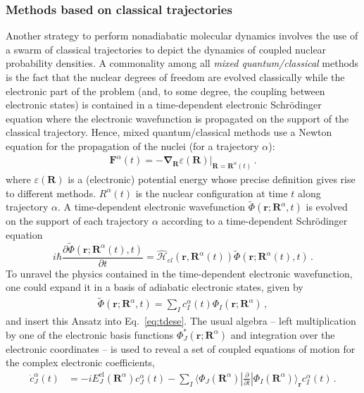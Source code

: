 \documentclass[9pt,bestpractices,pubversion]{livecoms}
\newcommand{\bra}[1]{\langle #1|}
\newcommand{\ket}[1]{|#1\rangle}
\newcommand{\bs}{\mathbf}
\begin{document}
\subsubsection{Methods based on classical trajectories}
\label{sec:classtrajmethod}

Another strategy to perform nonadiabatic molecular dynamics involves the use of a swarm of classical trajectories to depict the dynamics of coupled nuclear probability densities. A commonality among all \textit{mixed quantum/classical} methods is the fact that the nuclear degrees of freedom are evolved classically while the electronic part of the problem (and, to some degree, the coupling between electronic states) is contained in a time-dependent electronic Schr\"{o}dinger equation where the electronic wavefunction is propagated on the support of the classical trajectory. Hence, mixed quantum/classical methods use a Newton equation for the propagation of the nuclei (for a trajectory $\alpha$):
\begin{align}
\mathbf F^{\alpha}(t) = -\boldsymbol\nabla_{\bs R} \varepsilon(\bs R)|_{\bs R = \bs R^{\alpha}(t)} \, .
\label{eqn: quantum-classical general}
\end{align}
where $\varepsilon(\bs R)$ is a (electronic) potential energy whose precise definition gives rise to different methods. $R^{\alpha}(t)$ is the nuclear configuration at time $t$ along trajectory $\alpha$. A time-dependent electronic wavefunction $\tilde{\Phi}(\bs r; \bs R^{\alpha}, t)$ is evolved on the support of each trajectory $\alpha$ according to a time-dependent Schr\"{o}dinger equation
\begin{equation}
i \hbar \frac{\partial \tilde{\Phi}(\bs r; \bs R^\alpha(t), t)}{\partial t} = \hat{\mathcal{H}}_{el}(\bs r, \bs R^\alpha(t)) \tilde{\Phi}(\bs r; \bs R^\alpha(t), t) \, .
\label{eq:tdese}
\end{equation}
To unravel the physics contained in the time-dependent electronic wavefunction, one could expand it in a basis of adiabatic electronic states,
given by 
\begin{align}
\tilde{\Phi}(\bs r; \bs R^{\alpha}, t) = \sum_I c_I^\alpha(t) \Phi_I(\bs r; \bs R^{\alpha}) \, ,
\label{eqn: surface-hopping BH expansion}
\end{align}
and insert this Ansatz into Eq.~\eqref{eq:tdese}. The usual algebra -- left multiplication by one of the electronic basis functions $\Phi_J^\ast(\bs r; \bs R^{\alpha})$ and integration over the electronic coordinates -- is used to reveal a set of coupled equations of motion for the complex electronic coefficients, 
\begin{align}
\dot c_{J}^{\alpha}(t) &= -i  E_J^{\text{el}}\left(\bs R^{\alpha}\right)c_J^{\alpha}(t)-\sum_I  \bra{\Phi_J(\bs R^{\alpha})}\frac{\partial}{\partial t}\ket{\Phi_I(\bs R^{\alpha})}_{\mathbf{r}}  c_I^{\alpha}(t) \, .
\label{tdese_coeff_intermed}
\end{align}
\end{document}
